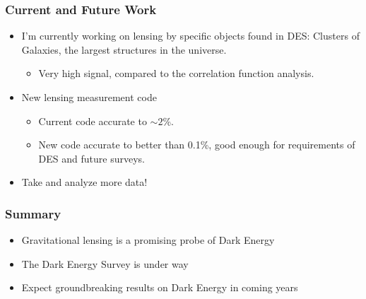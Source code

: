 \documentclass{beamer}
\begin{document}
\frame
{

    \frametitle{Current and Future Work}
 
 
    \begin{itemize}


        \item I'm currently working on lensing by specific objects found in
            DES: Clusters of Galaxies, the largest structures in the universe.

        \begin{itemize}
            \item Very high signal, compared to the correlation function analysis.
        \end{itemize}

        \item New lensing measurement code
        \begin{itemize}
            \item Current code accurate to $\sim 2$\%.
            \item New code accurate to better than 0.1\%, good enough for
                requirements of DES and future surveys.
        \end{itemize}

        \item Take and analyze more data!

    \end{itemize}

}




\frame
{

    \frametitle{Summary}
 
 
    \begin{itemize}

        \item Gravitational lensing is a promising probe of Dark Energy

        \item The Dark Energy Survey is under way

        \item Expect groundbreaking results on Dark Energy in coming years

    \end{itemize}

}
\end{document}
